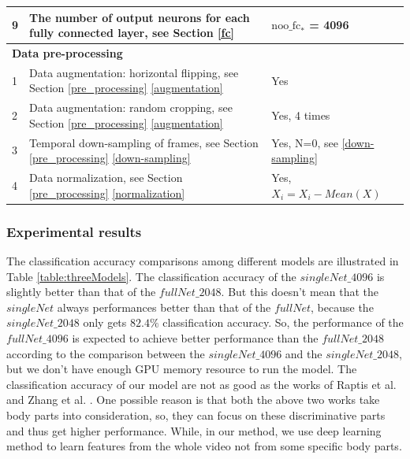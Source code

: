 \begin{table}
\begin{center}
\begin{tabular}{| m{0.6cm} | m{7cm} | m{6cm} |}
			9 &  The number of output neurons for each fully connected layer, see Section \ref{fc} & \(\text{noo\_fc}_*\) = 4096 \\ \hline \hline                           
			
			\multicolumn{3}{|l|}{\textbf{Data pre-processing}}  \\ \hline
			1 & Data augmentation: horizontal flipping, see Section \ref{pre_processing} \ref{augmentation} & Yes  \\ \hline
			2 & Data augmentation: random cropping, see Section \ref{pre_processing} \ref{augmentation} & Yes, 4 times \\ \hline
			3 & Temporal down-sampling of frames, see Section \ref{pre_processing} \ref{down-sampling} & Yes, N=0, see \ref{down-sampling} \\ \hline
			
			4 & Data normalization, see Section \ref{pre_processing} \ref{normalization} & Yes, \(X_i = X_i - Mean(X)\) \\ \hline			
		\end{tabular}
		\label{table:network_settings}
	\end{center}
\end{table} 
\subsubsection*{Experimental results}
The classification accuracy comparisons among different models are illustrated in Table \ref{table:threeModels}.  The classification accuracy of the \(singleNet\_4096\) is slightly better than that of the \(fullNet\_2048\). But this doesn't mean that the \(singleNet\) always performances better than that of the \(fullNet\), because the \(singleNet\_2048\) only gets \(82.4\%\) classification accuracy. So, the performance of the \(fullNet\_4096\) is expected to achieve better performance than the \(fullNet\_2048\) according to the comparison between the \(singleNet\_4096\) and the \(singleNet\_2048\), but we don't have enough GPU memory resource to run the model. The classification accuracy of our model are not as good as the works of Raptis et al. \cite{raptis} and Zhang et al. \cite{yimeng}. One possible reason is that both the above two works take body parts into consideration, so, they can focus on these discriminative parts and thus get higher performance. While, in our method, we use deep learning method to learn features from the whole video not from some specific body parts.  

